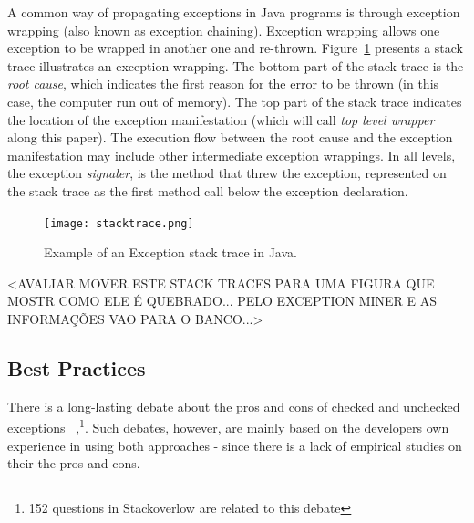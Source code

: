 \documentclass[conference]{IEEEtran}
\begin{document}
 A common way of  propagating exceptions in Java programs is through exception wrapping
 (also known as exception chaining). Exception wrapping allows one exception 
to be wrapped in another one and re-thrown. Figure~\ref{fig:wrapping} presents 
a stack trace  illustrates an exception wrapping. The bottom 
part of the stack trace is the \emph{root cause}, which indicates the
first reason for the error to be thrown (in this case, the computer run out of
memory). The top part of the stack trace indicates the location of the exception
manifestation (which will call \emph{top level wrapper} along this paper). The
execution flow  between the root cause and the exception manifestation may
include other intermediate exception wrappings. In all levels, the exception
\emph{signaler}, is the method that threw the exception, represented on the
stack trace as the first method call below the exception declaration.

\begin{figure} \centering \texttt{[image: stacktrace.png]}
\caption{Example of an Exception stack trace in Java.}
\label{fig:wrapping}
\end{figure}

<AVALIAR MOVER ESTE STACK TRACES PARA UMA FIGURA QUE MOSTR COMO ELE É QUEBRADO...
PELO EXCEPTION MINER E AS INFORMAÇÕES VAO PARA O BANCO...>


\subsection{Best Practices}
\label{sec:best}

There is a long-lasting debate about the pros and cons of checked and unchecked exceptions 
~\cite{javatut,stackoverlow,debate},\footnote{152 questions in Stackoverlow
are related to this debate}. Such debates, however, are mainly based on the developers own experience in
using both approaches - since there is a lack of empirical studies on their the pros and cons.
\end{document}
